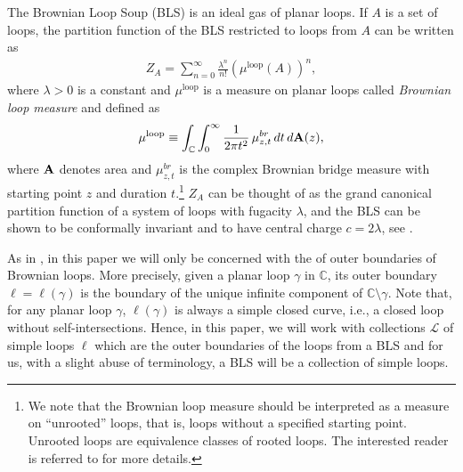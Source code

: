 \documentclass[a4paper,11pt]{article}
\begin{document}
The Brownian Loop Soup (BLS) is an ideal gas of planar loops. 
If $A$ is a set of loops, the partition function of the BLS restricted to loops from $A$ can be written as
\begin{align}
    {Z_A = \sum_{n=0}^{\infty} \frac{\lambda^n}{n!} \left( \mu^{\text{loop}}(A) \right)^n},
\end{align}
where $\lambda>0$ is a constant and $\mu^{\text{loop}}$ is a measure on planar loops called \emph{Brownian loop measure} and defined as
\begin{align} \label{brownian-loop-measure}
\mu^{\text{loop}} \equiv \int_{\mathbb C} \int_0^{\infty} \frac{1}{2 \pi t^2} \, \mu^{br}_{z,t} \, dt \, d{\bf A}(z),
\end{align}
where $\bf A$ denotes area and $\mu^{br}_{z,t}$ is the complex Brownian bridge measure with starting point
$z$ and duration $t$.\footnote{We note that the Brownian loop measure should be interpreted as a measure on ``unrooted''
loops, that is, loops without a specified starting point. Unrooted loops are equivalence classes of rooted
loops. The interested reader is referred to \cite{lawler2004brownian} for more details.}
$Z_A$ can be thought of as the grand canonical partition function of a system of loops with fugacity $\lambda$, and the BLS can be shown to be conformally invariant and to have central charge $c=2\lambda$, see \cite{lawler2004brownian,Camia_2016}.

As in \cite{camia2021scalar}, in this paper we will only be concerned with the of outer boundaries of Brownian loops. More precisely, given a planar loop $\gamma$ in $\mathbb C$, its outer boundary $\ell=\ell(\gamma)$ is the boundary of the unique infinite component of ${\mathbb C} \setminus \gamma$. %
Note that, for any planar loop $\gamma$, $\ell(\gamma)$ is always a simple closed curve, i.e., a closed loop without self-intersections. Hence, in this paper, we will work with collections ${\mathcal L}$ of simple loops $\ell$ which are the outer boundaries of the loops from a BLS and for us, with a slight abuse of terminology, a BLS will be a collection of simple loops.
\end{document}
